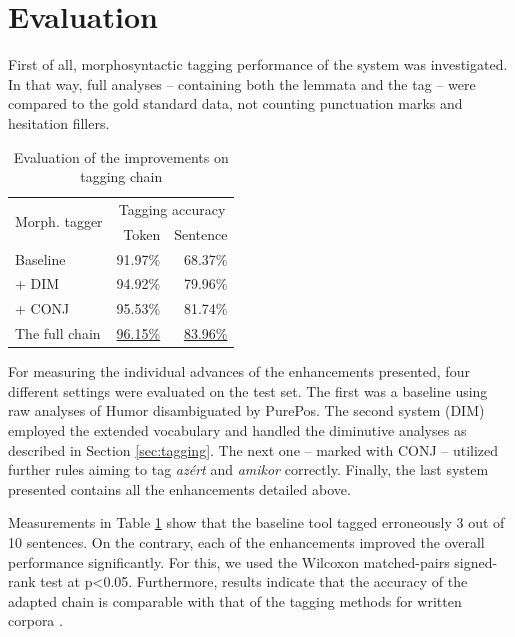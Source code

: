 \section{Evaluation}

First of all, morphosyntactic tagging performance of the system was investigated. 
In that way, full analyses -- containing both the lemmata and the tag -- were compared to the gold standard data, not counting punctuation marks and hesitation fillers.

\begin{table}[H]
\centering
\caption{Evaluation of the improvements on tagging chain}
\label{tab:eval_tag}
\begin{tabular}{ l r r} 
\hline
\multicolumn{1}{l}{\multirow{2}{*}{Morph. tagger}} & \multicolumn{2}{c}{\hspace{0.8cm} Tagging accuracy} \\
& Token &  Sentence \\
\hline
Baseline &  \hspace{0.8cm} 91.97\%  & \hspace{0.8cm} 68.37\% \\
\hspace{0.2cm} + DIM &  94.92\% & 79.96\% \\
\hspace{0.2cm} + CONJ & 95.53\% & 81.74\% \\
The full chain & \underline{96.15\%} & \underline{83.96\%} \\

\hline
\end{tabular}
\end{table}

For measuring the individual advances of the enhancements presented, four different settings were evaluated on the test set. 
The first was a baseline using raw analyses of Humor disambiguated by PurePos. 
The second system (DIM) employed the extended vocabulary and handled the diminutive analyses as described in Section \ref{sec:tagging}. 
The next one -- marked with CONJ -- utilized further rules aiming to tag \textit{azért} and \textit{amikor} correctly. 
Finally, the last system presented contains all the enhancements detailed above.

Measurements in Table \ref{tab:eval_tag} show that the baseline tool tagged erroneously 3 out of 10 sentences. 
On the contrary, each of the enhancements improved the overall performance significantly.
For this, we used the Wilcoxon matched-pairs signed-rank test at p<0.05. 
Furthermore, results indicate that the accuracy of the adapted chain is comparable with that of the tagging methods for written corpora \cite{zsibrata2013magyarlanc}. 

